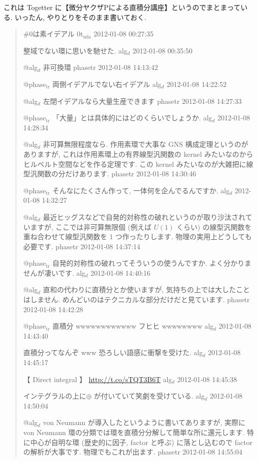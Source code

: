 \documentclass[openany, a4paper, oneside]{jsbook}
\theoremstyle{break}
\theoremstyle{breakdefn}
\begin{document}
これは Togetter に【微分ヤクザPによる直積分講座】というのでまとまっている.
いったん, やりとりをそのまま書いておく.
\begin{quote}
\#0は素イデアル
0t$_{\mathrm{uda}}$ 2012-01-08 00:27:35

整域でない環に思いを馳せた.
alg$_d$ 2012-01-08 00:35:50

@alg$_d$ 非可換環
phasetr 2012-01-08 14:13:42

@phase$_{\mathrm{tr}}$ 両側イデアルでない右イデアル
alg$_d$ 2012-01-08 14:22:52

@alg$_d$ 左閉イデアルなら大量生産できます
phasetr 2012-01-08 14:27:33

@phase$_{\mathrm{tr}}$ 「大量」とは具体的にはどのくらいでしょうか.
alg$_d$ 2012-01-08 14:28:34

@alg$_d$ 非可算無限程度なら. 作用素環で大事な GNS 構成定理というのがありますが,
これは作用素環上の有界線型汎関数の kernel みたいなのからヒルベルト空間などを作る定理です.
この kernel みたいなのが大雑把に線型汎関数の分だけあります.
phasetr 2012-01-08 14:30:46

@phase$_{\mathrm{tr}}$ そんなにたくさん作って, 一体何を企んでるんですか.
alg$_d$ 2012-01-08 14:32:27

@alg$_d$ 最近ヒッグスなどで自発的対称性の破れというのが取り沙汰されていますが,
ここでは非可算無限個 (例えば $U (1)$ くらい) の線型汎関数を重ね合わせて線型汎関数を 1 つ作ったりします.
物理の実用上どうしても必要です.
phasetr 2012-01-08 14:37:14

@phase$_{\mathrm{tr}}$ 自発的対称性の破れってそういうの使うんですか. よく分かりませんが凄いです.
alg$_d$ 2012-01-08 14:40:16

@alg$_d$ 直和の代わりに直積分とか使いますが, 気持ちの上では大したことはしません.
めんどいのはテクニカルな部分だけだと見ています.
phasetr 2012-01-08 14:42:28

@phase$_{\mathrm{tr}}$ 直積分 wwwwwwwwwwww フヒヒ wwwwwwww
alg$_d$ 2012-01-08 14:43:40

直積分ってなんぞ www 恐ろしい語感に衝撃を受けた.
alg$_d$ 2012-01-08 14:45:17

【 Direct integral 】
\href{http://t.co/sTQT3B6T}{http://t.co/sTQT3B6T}
alg$_d$ 2012-01-08 14:45:38

インテグラルの上に$\oplus$ が付いていて笑劇を受けている.
alg$_d$ 2012-01-08 14:50:04

@alg$_d$ von Neumann が導入したというように書いてありますが,
実際に von Neumann 環の分類では環を直積分分解して簡単な所に還元します.
特に中心が自明な環 (歴史的に因子, factor と呼ぶ) に落とし込むので factor の解析が大事です.
物理でもこれが出ます.
phasetr 2012-01-08 14:55:04


\end{quote}
\end{document}

